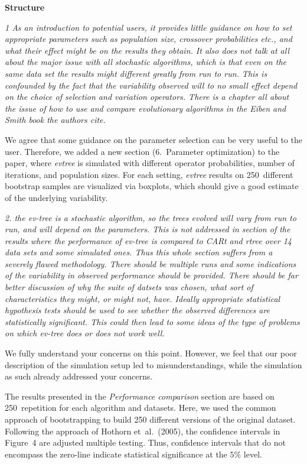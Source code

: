 \documentclass[DIN, pagenumber=false, parskip=half,%
               fromalign=left, fromphone=true,%
               fromemail=true, fromurl=false, %
               fromlogo=true, fromrule=false, fromrule=afteraddress]{scrlttr2}
\begin{document}
\textbf{Structure}

\textit{1 As an introduction to potential users,  it provides little 
guidance on how to set appropriate parameters
such as population size,  crossover probabilities etc.,  and what 
their effect might be on the results they obtain.  It also does not 
talk at all about the major issue with all  stochastic algorithms, 
which is that even on the same data set the results might different 
greatly from run to run. This is confounded by the fact that the 
variability observed will to no small effect depend on the choice 
of selection and variation operators.  There is a chapter all about 
the issue of how to use and compare evolutionary algorithms in 
the Eiben and Smith book the authors cite.} 

We agree that some guidance on the parameter selection can be very useful to the user.
Therefore, we added a new section (6.~Parameter optimization) to the paper, where \textit{evtree} is simulated
with different operator probabilities, number of iterations, and population
sizes. For each setting, \textit{evtree} results on 250~different bootstrap samples are visualized via
boxplots, which should give a good estimate of the underlying variability.


\textit{2.  the ev-tree is a stochastic algorithm,  so the trees evolved 
will vary from run to run,  and will depend on the parameters.  This is not addressed in section of the results where the performance 
of ev-tree is compared to CARt and rtree over 14 data sets and some 
simulated ones.  Thus this whole section suffers from a  severely 
flawed methodology.   There should be multiple runs and some 
indications of the variability in observed performance should be 
provided. There should be far better discussion of why the suite 
of datsets was chosen, what sort of characteristics they might, or 
might not, have.  Ideally appropriate statistical hypothesis tests 
should be used to see whether the observed differences are 
statistically significant.  This could then lead to some ideas of 
the type of problems on which ev-tree does or does not work well.
}

We fully understand your concerns on this point. However, we feel
that our poor description of the simulation setup led to misunderstandings, while
the simulation as such already addressed your concerns.

The results presented in the \textit{Performance  comparison} section are based
on 250~repetition for each algorithm and datasets. Here, we used the common approach of
bootstrapping to build 250 different versions of the original dataset. Following the
approach of Hothorn et~al.\ (2005), the confidence intervals in Figure~4 are adjusted
multiple testing. Thus, confidence intervals that do not encompass the zero-line
indicate statistical significance at the $5\%$ level.
\end{document}
